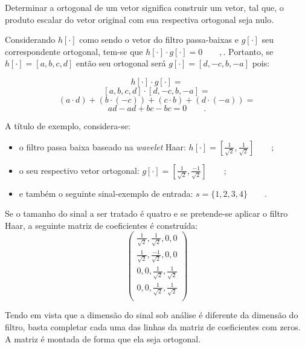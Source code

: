 			\par Determinar a ortogonal de um vetor significa construir um vetor, tal que, o produto escalar do vetor original com sua respectiva ortogonal seja nulo.
			
			\par Considerando $h[\cdot]$ como sendo o vetor do filtro passa-baixas e $g[\cdot]$ seu correspondente ortogonal, tem-se que $h[\cdot] \cdot g[\cdot] = 0\qquad,$. Portanto, se $h[\cdot]=[a, b, c, d]$ então seu ortogonal será $g[\cdot]=[d, -c, b, -a]$ pois:
			
			$$
				h[\cdot] \cdot g[\cdot]  =
			$$
			$$
			    [a, b, c, d] \cdot [d, -c, b, -a] = 
			$$
			$$
				(a \cdot d) + (b \cdot (-c)) + (c \cdot b) + (d \cdot (-a)) = 
			$$
			$$
				ad - ad + bc - bc = 0 \qquad.
			$$

			\par A título de exemplo, considera-se:
			\begin{itemize}
				\item o filtro passa baixa baseado na \textit{wavelet} Haar: $h[\cdot] = [\frac{1}{\sqrt{2}}, \frac{1}{\sqrt{2}}]\qquad;$
				\item o seu respectivo vetor ortogonal: $g[\cdot] = [\frac{1}{\sqrt{2}}, \frac{-1}{\sqrt{2}}]\qquad;$
				\item e também o seguinte sinal-exemplo de entrada: $s = \{1,2,3,4\}\qquad.$
			\end{itemize}

			\par Se o tamanho do sinal a ser tratado é quatro e se pretende-se aplicar o filtro Haar, a seguinte matriz de coeficientes é construída:
			\begin{equation}
				\begin{pmatrix}
					\frac{1}{\sqrt{2}}, \frac{1}{\sqrt{2}}, 0, 0\\
					\frac{1}{\sqrt{2}}, \frac{-1}{\sqrt{2}}, 0, 0\\
					0, 0, \frac{1}{\sqrt{2}}, \frac{1}{\sqrt{2}}\\
					0, 0, \frac{1}{\sqrt{2}}, \frac{1}{\sqrt{2}}\\
					\label{eq:haarFilters}
				\end{pmatrix} 
			\end{equation}
			\par Tendo em vista que a dimensão do sinal sob análise é diferente da dimensão do filtro, basta completar cada uma das linhas da matriz de coeficientes com zeros. A matriz é montada de forma que ela seja ortogonal.

